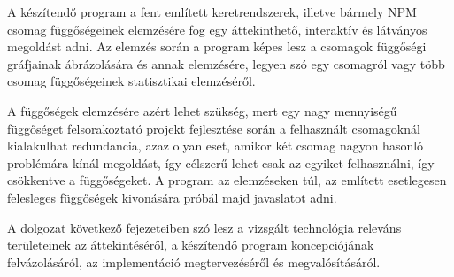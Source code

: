 A készítendő program a fent említett keretrendszerek, illetve bármely NPM csomag függőségeinek elemzésére fog egy áttekinthető, interaktív és látványos megoldást adni. Az elemzés során a program képes lesz a csomagok függőségi gráfjainak ábrázolására és annak elemzésére, legyen szó egy csomagról vagy több csomag függőségeinek statisztikai elemzéséről.

A függőségek elemzésére azért lehet szükség, mert egy nagy mennyiségű függőséget felsorakoztató projekt fejlesztése során a felhasznált csomagoknál kialakulhat redundancia, azaz olyan eset, amikor két csomag nagyon hasonló problémára kínál megoldást, így célszerű lehet csak az egyiket felhasználni, így csökkentve a függőségeket. A program az elemzéseken túl, az említett esetlegesen felesleges függőségek kivonására próbál majd javaslatot adni.

A dolgozat következő fejezeteiben szó lesz a vizsgált technológia releváns területeinek az áttekintéséről, a készítendő program koncepciójának felvázolásáról, az implementáció megtervezéséről és megvalósításáról.
